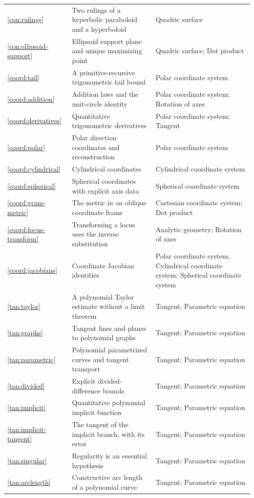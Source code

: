 \begin{longtable}{p{.08\linewidth}p{.55\linewidth}p{.28\linewidth}}
\ref{con:rulings} & Two rulings of a hyperbolic paraboloid and a hyperboloid & Quadric surface \\
\ref{con:ellipsoid-support} & Ellipsoid support plane and unique maximizing point & Quadric surface; Dot product \\
\ref{coord:tail} & A primitive-recursive trigonometric tail bound & Polar coordinate system \\
\ref{coord:addition} & Addition laws and the unit-circle identity & Polar coordinate system; Rotation of axes \\
\ref{coord:derivatives} & Quantitative trigonometric derivatives & Polar coordinate system; Tangent \\
\ref{coord:polar} & Polar direction coordinates and reconstruction & Polar coordinate system \\
\ref{coord:cylindrical} & Cylindrical coordinates & Cylindrical coordinate system \\
\ref{coord:spherical} & Spherical coordinates with explicit axis data & Spherical coordinate system \\
\ref{coord:gram-metric} & The metric in an oblique coordinate frame & Cartesian coordinate system; Dot product \\
\ref{coord:locus-transform} & Transforming a locus uses the inverse substitution & Analytic geometry; Rotation of axes \\
\ref{coord:jacobians} & Coordinate Jacobian identities & Polar coordinate system; Cylindrical coordinate system; Spherical coordinate system \\
\ref{tan:taylor} & A polynomial Taylor estimate without a limit theorem & Tangent; Parametric equation \\
\ref{tan:graphs} & Tangent lines and planes to polynomial graphs & Tangent; Parametric equation \\
\ref{tan:parametric} & Polynomial parametrized curves and tangent transport & Tangent; Parametric equation \\
\ref{tan:divided} & Explicit divided-difference bounds & Tangent; Parametric equation \\
\ref{tan:implicit} & Quantitative polynomial implicit function & Tangent; Parametric equation \\
\ref{tan:implicit-tangent} & The tangent of the implicit branch, with its error & Tangent; Parametric equation \\
\ref{tan:singular} & Regularity is an essential hypothesis & Tangent; Parametric equation \\
\ref{tan:arclength} & Constructive arc length of a polynomial curve & Tangent; Parametric equation \\
\end{longtable}\normalsize
